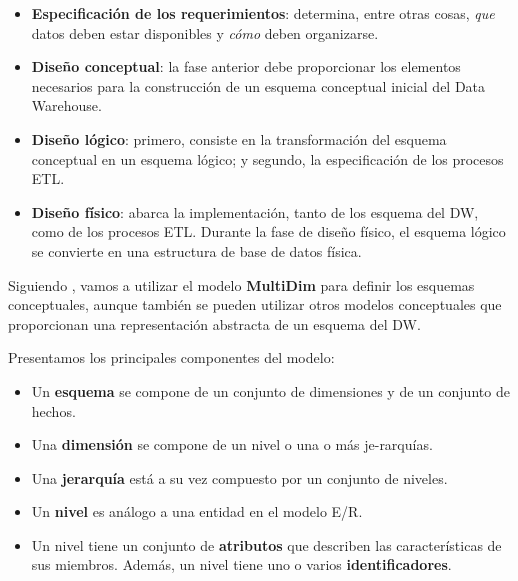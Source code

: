 \documentclass{fancyslides}
\begin{document}
\begin{frame}
\misc
{

\begin{itemize}
  \item \textbf{Especificación de los requerimientos}: \justifying determina, entre otras cosas, \textit{que} datos deben estar disponibles y \textit{cómo} deben organizarse. 
  \item \textbf{Diseño conceptual}: \justifying la fase anterior debe proporcionar los elementos necesarios para la construcción de un esquema conceptual inicial del Data Warehouse.
  \item \textbf{Diseño lógico}: \justifying primero, consiste en la transformación del esquema conceptual en un esquema lógico; y segundo, la especificación de los procesos ETL.
  \item \textbf{Diseño físico}: \justifying abarca la implementación, tanto de los esquema del DW, como de los procesos ETL. Durante la fase de diseño físico, el esquema lógico se convierte en una estructura de base de datos física.
\end{itemize}

}
\end{frame}

\begin{frame}
\end{frame}

\begin{frame}
\misc
{
\justifying Siguiendo \cite{VaismanZimanyi14}, vamos a utilizar el modelo \textbf{MultiDim} para definir los esquemas conceptuales, aunque también se pueden utilizar otros modelos conceptuales que proporcionan una representación abstracta de un esquema del DW.
}
\end{frame}

\begin{frame}
\misc
{
Presentamos los principales componentes del modelo:
\begin{itemize}
  \item \justifying Un \textbf{esquema} se compone de un conjunto de dimensiones y de un conjunto de hechos.
  \item \justifying Una \textbf{dimensión} se compone de un nivel o una o más je-rarquías.
  \item \justifying Una \textbf{jerarquía} está a su vez compuesto por un conjunto de niveles.
  \item \justifying Un \textbf{nivel} es análogo a una entidad en el modelo E/R.
  \item \justifying Un nivel tiene un conjunto de \textbf{atributos} que describen las características de sus miembros. Además, un nivel tiene uno o varios \textbf{identificadores}.
\end{itemize}
}
\end{frame}
\end{document}

